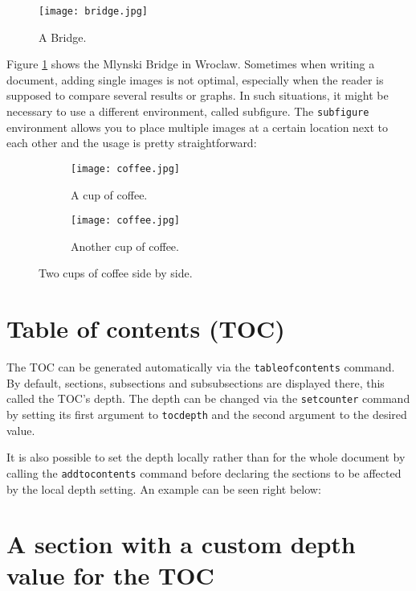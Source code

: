 \documentclass{article}
\begin{document}
\begin{figure}[h!]
    \texttt{[image: bridge.jpg]}
    \caption{A Bridge.}
    \label{fig:bridge}
\end{figure}

Figure \ref{fig:bridge} shows the Mlynski Bridge in Wroclaw. Sometimes when
writing a document, adding single images is not optimal, especially when the
reader is supposed to compare several results or graphs. In such situations, it
might be necessary to use a different environment, called subfigure. The
\texttt{subfigure} environment allows you to place multiple images at a certain
location next to each other and the usage is pretty straightforward:

\begin{figure}[h!]
    \centering
    \begin{subfigure}[b]{0.4\linewidth}
        \texttt{[image: coffee.jpg]}
        \caption{A cup of coffee.}
    \end{subfigure}
    \begin{subfigure}[b]{0.4\linewidth}
        \texttt{[image: coffee.jpg]}
        \caption{Another cup of coffee.}
    \end{subfigure}
    \caption{Two cups of coffee side by side.}
    \label{fig:coffee}
\end{figure}

\section{Table of contents (TOC)}

The TOC can be generated automatically via the \texttt{tableofcontents} command.
By default, sections, subsections and subsubsections are displayed there, this
called the TOC's depth. The depth can be changed via the \texttt{setcounter}
command by setting its first argument to \texttt{tocdepth} and the second
argument to the desired value.

It is also possible to set the depth locally rather than for the whole document
by calling the \texttt{addtocontents} command before declaring the sections to
be affected by the local depth setting. An example can be seen right below:


\section{A section with a custom depth value for the TOC}
\end{document}
